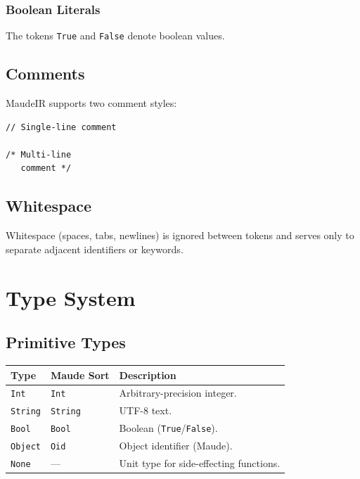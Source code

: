 \documentclass[11pt,letterpaper]{article}
\begin{document}
\subsubsection{Boolean Literals}
The tokens \lstinline{True} and \lstinline{False} denote boolean values.

\subsection{Comments}

MaudeIR supports two comment styles:

\begin{lstlisting}[numbers=none]
// Single-line comment

/* Multi-line
   comment */
\end{lstlisting}

\subsection{Whitespace}

Whitespace (spaces, tabs, newlines) is ignored between tokens and serves
only to separate adjacent identifiers or keywords.


\section{Type System}
\label{sec:types}

\subsection{Primitive Types}

\begin{longtable}{@{}llp{7.8cm}@{}}
\toprule
\textbf{Type}    & \textbf{Maude Sort} & \textbf{Description} \\
\midrule
\texttt{Int}     & \texttt{Int}        & Arbitrary-precision integer. \\
\texttt{String}  & \texttt{String}     & UTF-8 text. \\
\texttt{Bool}    & \texttt{Bool}       & Boolean (\texttt{True}/\texttt{False}). \\
\texttt{Object}  & \texttt{Oid}        & Object identifier (Maude). \\
\texttt{None}    & ---                 & Unit type for side-effecting functions. \\
\bottomrule
\end{longtable}
\end{document}
